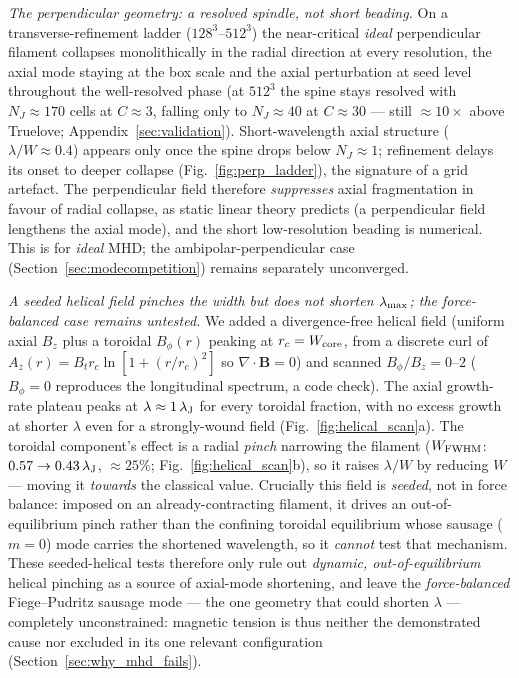 \documentclass[usenatbib,twoside,twocolumn]{mnras}
\begin{document}
\emph{The perpendicular geometry: a resolved spindle, not short beading.} On a transverse-refinement ladder ($128^3$--$512^3$) the near-critical \emph{ideal} perpendicular filament collapses monolithically in the radial direction at every resolution, the axial mode staying at the box scale and the axial perturbation at seed level throughout the well-resolved phase (at $512^3$ the spine stays resolved with $N_J\approx170$ cells at $C\approx3$, falling only to $N_J\approx40$ at $C\approx30$ --- still $\approx10\times$ above Truelove; Appendix~\ref{sec:validation}). Short-wavelength axial structure ($\lambda/W\approx0.4$) appears only once the spine drops below $N_J\approx1$; refinement delays its onset to deeper collapse (Fig.~\ref{fig:perp_ladder}), the signature of a grid artefact. The perpendicular field therefore \emph{suppresses} axial fragmentation in favour of radial collapse, as static linear theory predicts (a perpendicular field lengthens the axial mode), and the short low-resolution beading is numerical. This is for \emph{ideal} MHD; the ambipolar-perpendicular case (Section~\ref{sec:modecompetition}) remains separately unconverged.

\emph{A seeded helical field pinches the width but does not shorten $\lambda_{\rm max}$; the force-balanced case remains untested.} We added a divergence-free helical field (uniform axial $B_z$ plus a toroidal $B_\phi(r)$ peaking at $r_c=W_{\rm core}$, from a discrete curl of $A_z(r)=B_t r_c\ln[1+(r/r_c)^2]$ so $\nabla\!\cdot\!\mathbf{B}=0$) and scanned $B_\phi/B_z=0$--$2$ ($B_\phi=0$ reproduces the longitudinal spectrum, a code check). The axial growth-rate plateau peaks at $\lambda\approx1\,\lambda_{\rm J}$ for every toroidal fraction, with no excess growth at shorter $\lambda$ even for a strongly-wound field (Fig.~\ref{fig:helical_scan}a). The toroidal component's effect is a radial \emph{pinch} narrowing the filament ($W_{\rm FWHM}$: $0.57\to0.43\,\lambda_{\rm J}$, $\approx25\%$; Fig.~\ref{fig:helical_scan}b), so it raises $\lambda/W$ by reducing $W$ --- moving it \emph{towards} the classical value. Crucially this field is \emph{seeded}, not in force balance: imposed on an already-contracting filament, it drives an out-of-equilibrium pinch rather than the confining toroidal equilibrium whose sausage ($m=0$) mode carries the shortened \citet{Fiege2000} wavelength, so it \emph{cannot} test that mechanism. These seeded-helical tests therefore only rule out \emph{dynamic, out-of-equilibrium} helical pinching as a source of axial-mode shortening, and leave the \emph{force-balanced} Fiege--Pudritz sausage mode --- the one geometry that could shorten $\lambda$ --- completely unconstrained: magnetic tension is thus neither the demonstrated cause nor excluded in its one relevant configuration (Section~\ref{sec:why_mhd_fails}).
\end{document}
